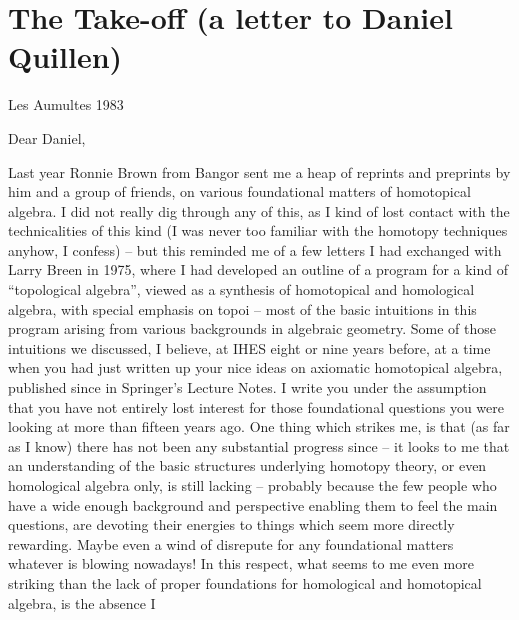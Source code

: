 
\chapter{The Take-off (a letter to Daniel Quillen)}
\label{ch:I}

\par\hfill Les Aumultes 1983\par

Dear Daniel,

\label{sec:1}%
Last year Ronnie Brown from Bangor sent me a heap of reprints and
preprints by him and a group of friends, on various foundational
matters of homotopical algebra. I did not really dig through any of
this, as I kind of lost contact with the technicalities of this kind
(I was never too familiar with the homotopy techniques anyhow, I
confess) -- but this reminded me of a few letters I had exchanged with
Larry Breen in 1975, where I had developed an outline of a program for
a kind of ``topological algebra'', viewed as a synthesis of
homotopical and homological algebra, with special emphasis on topoi --
most of the basic intuitions in this program arising from various
backgrounds in algebraic geometry. Some of those intuitions we
discussed, I believe, at IHES eight or nine years before, at a time
when you had just written up your nice ideas on axiomatic homotopical
algebra, published since in
Springer's Lecture Notes. I write you under the assumption that you
have not entirely lost interest for those foundational questions you
were looking at more than fifteen years ago. One thing which strikes
me, is that (as far as I know) there has not been any substantial
progress since -- it looks to me that an understanding of the basic
structures underlying homotopy theory, or even homological algebra
only, is still lacking -- probably because the few people who have a
wide enough background and perspective enabling them to feel the main
questions, are devoting their energies to things which seem more
directly rewarding. Maybe even a wind of disrepute for any
foundational matters whatever is blowing nowadays!  In this respect,
what seems to me even more striking than the lack of proper
foundations for homological and homotopical algebra, is the absence I
